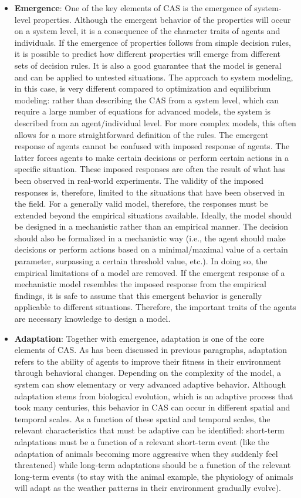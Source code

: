 \begin{itemize}
    \item \textbf{Emergence}: One of the key elements of CAS is the emergence of system-level properties. Although the emergent behavior of the properties will occur on a system level, it is a consequence of the character traits of agents and individuals. If the emergence of properties follows from simple decision rules, it is possible to predict how different properties will emerge from different sets of decision rules. It is also a good guarantee that the model is general and can be applied to untested situations. The approach to system modeling, in this case, is very different compared to optimization and equilibrium modeling: rather than describing the CAS from a system level, which can require a large number of equations for advanced models, the system is described from an agent/individual level. For more complex models, this often allows for a more straightforward definition of the rules. The emergent response of agents cannot be confused with imposed response of agents. The latter forces agents to make certain decisions or perform certain actions in a specific situation. These imposed responses are often the result of what has been observed in real-world experiments. The validity of the imposed responses is, therefore, limited to the situations that have been observed in the field. For a generally valid model, therefore, the responses must be extended beyond the empirical situations available. Ideally, the model should be designed in a mechanistic rather than an empirical manner. The decision should also be formalized in a mechanistic way (i.e., the agent should make decisions or perform actions based on a minimal/maximal value of a certain parameter, surpassing a certain threshold value, etc.). In doing so, the empirical limitations of a model are removed. If the emergent response of a mechanistic model resembles the imposed response from the empirical findings, it is safe to assume that this emergent behavior is generally applicable to different situations. Therefore, the important traits of the agents are necessary knowledge to design a model.
    \item \textbf{Adaptation}: Together with emergence, adaptation is one of the core elements of CAS. As has been discussed in previous paragraphs, adaptation refers to the ability of agents to improve their fitness in their environment through behavioral changes. Depending on the complexity of the model, a system can show elementary or very advanced adaptive behavior. Although adaptation stems from biological evolution, which is an adaptive process that took many centuries, this behavior in CAS can occur in different spatial and temporal scales. As a function of these spatial and temporal scales, the relevant characteristics that must be adaptive can be identified: short-term adaptations must be a function of a relevant short-term event (like the adaptation of animals becoming more aggressive when they suddenly feel threatened) while long-term adaptations should be a function of the relevant long-term events (to stay with the animal example, the physiology of animals will adapt as the weather patterns in their environment gradually evolve).

\end{itemize}
